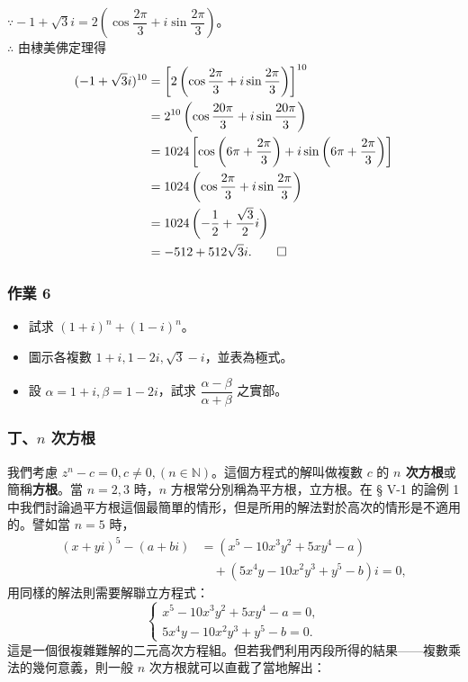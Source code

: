 \begin{solution}
$\because -1+\sqrt{3}i = 2\left(\cos\dfrac{2\pi}{3}+i\sin\dfrac{2\pi}{3}\right)$。 \\
$\therefore$ 由棣美佛定理得
\begin{align*}
(-1+\sqrt{3}i)^{10} &= \left[2\left(\cos\frac{2\pi}{3}+i\sin\frac{2\pi}{3}\right)\right]^{10} \\
&= 2^{10}\left(\cos\frac{20\pi}{3}+i\sin\frac{20\pi}{3}\right) \\
&= 1024\left[\cos\left(6\pi+\frac{2\pi}{3}\right)+i\sin\left(6\pi+\frac{2\pi}{3}\right)\right] \\
&= 1024\left(\cos\frac{2\pi}{3}+i\sin\frac{2\pi}{3}\right) \\
&= 1024\left(-\frac{1}{2}+\frac{\sqrt{3}}{2}i\right) \\
&= -512+512\sqrt{3}i. \qedhere
\end{align*}
\end{solution}

\subsubsection*{作業 6}
\begin{itemize}
  \item[(i)] 試求 $(1+i)^n + (1-i)^n$。
  \item[(ii)] 圖示各複數 $1+i, 1-2i, \sqrt{3}-i$，並表為極式。
  \item[(iii)] 設 $\alpha = 1+i, \beta = 1-2i$，試求 $\dfrac{\alpha-\beta}{\alpha+\beta}$ 之實部。
\end{itemize}


\subsubsection*{丁、$n$ 次方根}

我們考慮 $z^n-c=0, c \neq 0, (n \in \mathbb{N})$。這個方程式的解叫做複數 $c$ 的 \textbf{$n$ 次方根}或簡稱\textbf{方根}。當 $n=2, 3$ 時，$n$ 方根常分別稱為平方根，立方根。在 § V-1 的論例 1 中我們討論過平方根這個最簡單的情形，但是所用的解法對於高次的情形是不適用的。譬如當 $n=5$ 時，
\begin{align*}
(x+yi)^5-(a+bi) &= (x^5-10x^3 y^2+5xy^4-a) \\
&\quad + (5x^4 y-10x^2 y^3+y^5-b)i = 0,
\end{align*}
用同樣的解法則需要解聯立方程式：
\[
\begin{cases}
x^5-10x^3 y^2+5xy^4-a = 0, \\
5x^4 y-10x^2 y^3+y^5-b = 0.
\end{cases}
\]
這是一個很複雜難解的二元高次方程組。但若我們利用丙段所得的結果——複數乘法的幾何意義，則一般 $n$ 次方根就可以直截了當地解出：

